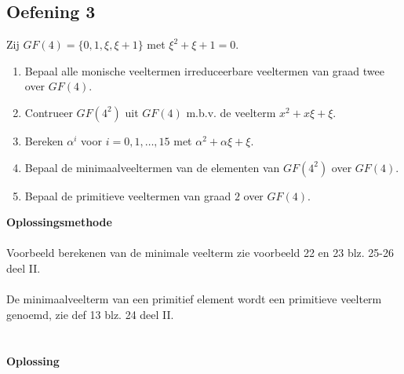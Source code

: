 \documentclass[11pt,a4paper,titlepage]{article}
\begin{document}
\subsection{Oefening 3}
Zij $GF(4) = \{0,1,\xi, \xi + 1\}$ met $\xi^2 + \xi + 1 = 0$.
\begin{enumerate}[label=(\alph*)]
	\item Bepaal alle monische veeltermen irreduceerbare veeltermen van graad twee over $GF(4)$.	
	\item Contrueer $GF(4^2)$ uit $GF(4)$ m.b.v. de veelterm $x^2+ x\xi + \xi$.
	\item Bereken $\alpha ^i$ voor $i = 0,1,\dots ,15$ met $\alpha ^2 + \alpha \xi + \xi$.
	\item Bepaal de minimaalveeltermen van de elementen van $GF(4^2)$ over $GF(4)$.
	\item Bepaal de primitieve veeltermen van graad $2$ over $GF(4)$.
\end{enumerate}
\textbf{Oplossingsmethode} \\ \\
Voorbeeld berekenen van de minimale veelterm zie voorbeeld 22 en 23 blz. 25-26 deel II.  \\ \\
De minimaalveelterm van een primitief element wordt een primitieve veelterm genoemd, zie def 13 blz. 24 deel II.\\
\\ \\ \textbf{Oplossing}
\end{document}
